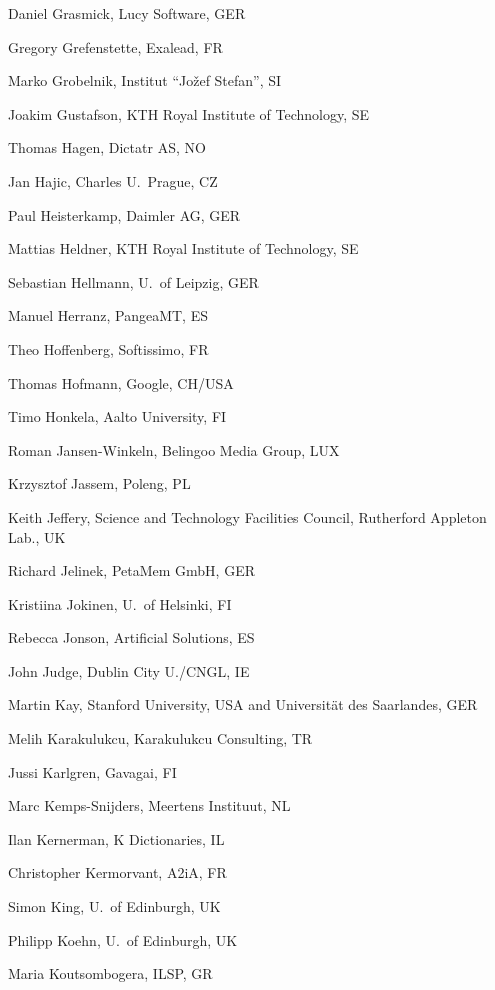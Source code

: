 \documentclass[10pt, plain]{../../metanetpaper}
\begin{document}
\begin{multicols}{3}
\begin{footnotesize}
\begin{enumerate}
{      \item Daniel Grasmick, Lucy Software, GER
      \item Gregory Grefenstette, Exalead, FR
      \item Marko Grobelnik, Institut ``Jožef Stefan'', SI
      \item Joakim Gustafson, KTH Royal Institute of Technology, SE
      \item Thomas Hagen, Dictatr AS, NO
      \item Jan Hajic, Charles U.~Prague, CZ
      \item Paul Heisterkamp, Daimler AG, GER
      \item Mattias Heldner, KTH Royal Institute of Technology, SE
      \item Sebastian Hellmann, U.~of Leipzig, GER
      \item Manuel Herranz, PangeaMT, ES
      \item Theo Hoffenberg, Softissimo, FR
      \item Thomas Hofmann, Google, CH/USA
      \item Timo Honkela, Aalto University, FI
      \item Roman Jansen-Winkeln, Belingoo Media Group, LUX
      \item Krzysztof Jassem, Poleng, PL
      \item Keith Jeffery, Science and Technology Facilities Council, Rutherford Appleton Lab., UK
      \item Richard Jelinek, PetaMem GmbH, GER
      \item Kristiina Jokinen, U.~of Helsinki, FI
      \item Rebecca Jonson, Artificial Solutions, ES
      \item John Judge, Dublin City U./CNGL, IE
      \item Martin Kay, Stanford University, USA and Universität des Saarlandes, GER
      \item Melih Karakulukcu, Karakulukcu Consulting, TR
      \item Jussi Karlgren, Gavagai, FI
      \item Marc Kemps-Snijders, Meertens Instituut, NL
      \item Ilan Kernerman, K Dictionaries, IL
      \item Christopher Kermorvant, A2iA, FR
      \item Simon King, U.~of Edinburgh, UK
      \item Philipp Koehn, U.~of Edinburgh, UK
      \item Maria Koutsombogera, ILSP, GR
}
\end{enumerate}
\end{footnotesize}
\end{multicols}
\end{document}
